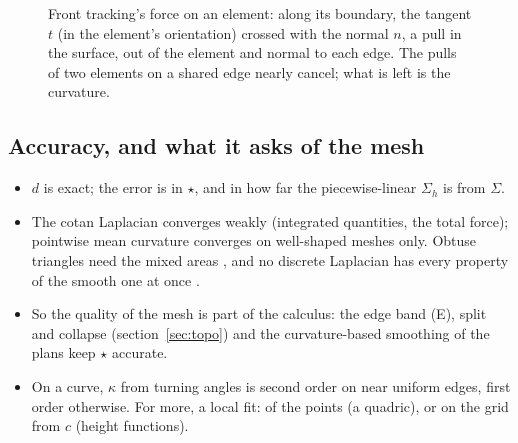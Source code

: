 \documentclass[10pt,a4paper]{article}
\theoremstyle{definition}
\begin{document}
\begin{figure}[H]
\centering
{}
\caption{Front tracking's force on an element: along its boundary, the
  tangent $t$ (in the element's orientation) crossed with the normal $n$,
  a pull in the surface, out of the element and normal to each edge. The
  pulls of two elements on a shared edge nearly cancel; what is left is
  the curvature.}
\label{fig:dec-st}
\end{figure}

\subsection{Accuracy, and what it asks of the mesh}

\begin{itemize}
  \item $d$ is exact; the error is in $\star$, and in how far the
    piecewise-linear $\Sigma_h$ is from $\Sigma$.
  \item The cotan Laplacian converges weakly (integrated quantities, the
    total force); pointwise mean curvature converges on well-shaped
    meshes only. Obtuse triangles need the mixed areas \cite{meyer}, and
    no discrete Laplacian has every property of the smooth one at once
    \cite{wardetzky}.
  \item So the quality of the mesh is part of the calculus: the edge band
    (E), split and collapse (section~\ref{sec:topo}) and the
    curvature-based smoothing of the plans keep $\star$ accurate.
  \item On a curve, $\kappa$ from turning angles is second order on near
    uniform edges, first order otherwise. For more, a local fit: of the
    points (a quadric), or on the grid from $c$ (height functions).
\end{itemize}
\end{document}
